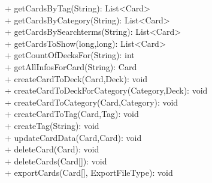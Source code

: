 { 
    + getCardsByTag(String): List<Card> \\ 
    + getCardsByCategory(String): List<Card> \\ 
    + getCardsBySearchterms(String): List<Card> \\ 
    + getCardsToShow(long,long): List<Card> \\ 
    + getCountOfDecksFor(String): int\\
    + getAllInfosForCard(String): Card\\
    + createCardToDeck(Card,Deck): void\\
    + createCardToDeckForCategory(Category,Deck): void\\
    + createCardToCategory(Card,Category): void\\
    + createCardToTag(Card,Tag): void\\
    + createTag(String): void\\
    + updateCardData(Card,Card): void\\
    + deleteCard(Card): void\\
    + deleteCards(Card[]): void\\
    + exportCards(Card[], ExportFileType): void\\
}{}